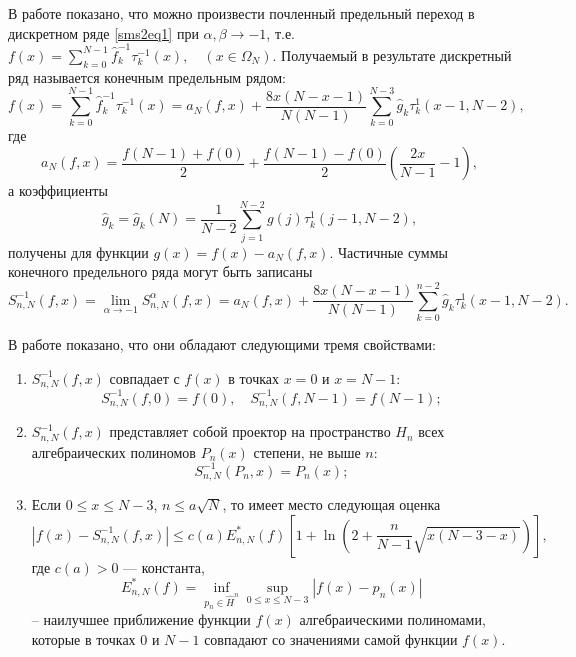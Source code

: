 В работе \cite{smsshti1} показано, что можно произвести почленный предельный переход в дискретном ряде \eqref{sms2eq1} при $\alpha,\beta \rightarrow -1$, т.е. $f(x) = \sum\limits_{k=0}^{N-1}\hat{f}^{-1}_k\tau_{k}^{-1}(x),\quad (x \in \Omega_N)$.
Получаемый в результате дискретный ряд называется конечным предельным рядом:
\begin{equation}
\label{limitR}
 f(x) = \sum\limits_{k=0}^{N-1}\hat{f}^{-1}_k  \tau_{k}^{-1}(x) =
a_N(f,x) + \frac{8x(N-x-1)}{N(N-1)} \sum\limits_{k=0}^{N-3} \hat{g}_k \tau_{k}^{1}(x-1,N-2),
\end{equation}
где
\begin{equation}
\label{af}
a_N(f,x) = \frac{f(N-1)+f(0)}{2} + \frac{f(N-1)-f(0)}{2}\left( \frac{2x}{N-1}-1\right),
\end{equation}
а коэффициенты
\begin{equation}
\label{gk}
\hat{g}_k = \hat{g}_k(N) = \frac{1}{N-2} \sum\limits_{j=1}^{N-2} g(j) \tau_{k}^{1}(j-1,N-2) ,
\end{equation}
получены для функции $g(x) = f(x) - a_N(f,x)$.
Частичные суммы конечного предельного ряда могут быть записаны
\begin{equation}
\label{limitS}
 S_{n,N}^{-1}(f,x) = \lim_{\alpha \rightarrow -1} S_{n,N}^{\alpha}(f,x) =
 a_N(f,x) + \frac{8x(N-x-1)}{N(N-1)} \sum\limits_{k=0}^{n-2} \hat{g}_k \tau_{k}^{1}(x-1,N-2).
\end{equation}

В работе \cite{smsshti1} показано, что они обладают следующими тремя свойствами:
\begin{enumerate}[1)]
  \item $S_{n,N}^{-1}(f,x)$ совпадает с $f(x)$ в точках $x=0$ и $x=N-1$:%
    \begin{equation}\label{limprop1}
        S_{n,N}^{-1}(f,0) = f(0), \quad S_{n,N}^{-1}(f,N-1)=f(N-1);
    \end{equation}
  \item $S_{n,N}^{-1}(f,x)$ представляет собой проектор на пространство $H_n$ всех алгебраических полиномов $P_n(x)$ степени, не выше $n$:%
    \begin{equation}\label{limprop2}
        S_{n,N}^{-1}(P_n,x) = P_n(x);
    \end{equation}
  \item Если $0\le x\le N-3$, $n\le a\sqrt{N}$, то имеет место следующая оценка
    \begin{equation}\label{applimitR}
        |f(x)-S_{n,N}^{-1}(f,x)|\le c(a)E_{n,N}^{*}(f)\left[1+\ln\left(2+\frac{n}{N-1}\sqrt{x(N-3-x)}\right)\right],
    \end{equation}
    где $c(a)>0$ --- константа,
    $$E_{n,N}^{*}(f) = \inf_{p_n \in \hat{H}^n} \sup_{0\le x\le N-3} |f(x)-p_n(x)|$$
    -- наилучшее приближение функции $f(x)$ алгебраическими полиномами, которые в точках $0$ и $N-1$ совпадают со значениями самой функции $f(x)$.
\end{enumerate}


